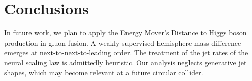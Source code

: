 \section{Conclusions}\label{sec:conclusions}

In future work, we plan to apply the Energy Mover's Distance to Higgs
boson production in gluon fusion. A weakly supervised hemisphere mass
difference emerges at next-to-next-to-leading order. The treatment of
the jet rates of the neural scaling law is admittedly heuristic. Our
analysis neglects generative jet shapes, which may become relevant at a
future circular collider.

